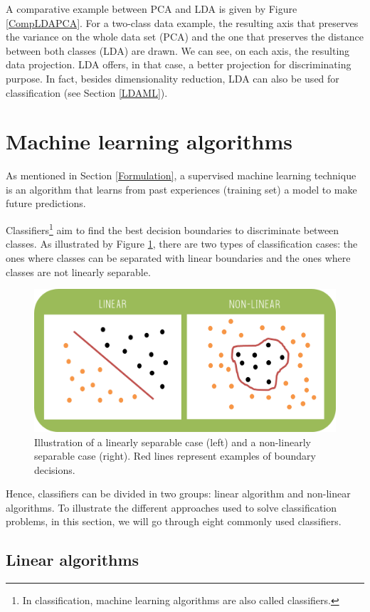 \documentclass[a4paper,10pt]{article}
\begin{document}
A comparative example between PCA and LDA is given by Figure \ref{CompLDAPCA}. For a two-class data example, the resulting axis that preserves the variance on the whole data set (PCA) and the one that preserves the distance between both classes (LDA) are drawn. We can see, on each axis, the resulting data projection. LDA offers, in that case, a better projection for discriminating purpose. In fact, besides dimensionality reduction, LDA can also be used for classification (see Section \ref{LDAML}).

\section{Machine learning algorithms}
\label{MLtech}
As mentioned in Section \ref{Formulation}, a supervised machine learning technique is an algorithm that learns from past experiences (training set) a model to make future predictions.

Classifiers\footnote{In classification, machine learning algorithms are also called classifiers.} aim to find the best decision boundaries to discriminate between classes. As illustrated by Figure \ref{LinearVsNonLinear}, there are two types of classification cases: the ones where classes can be separated with linear boundaries and the ones where classes are not linearly separable.

\begin{figure}[htbp]
\centerline{\includegraphics[width=0.65\linewidth]{./figures/LinearNonLinear.png}}
\caption{Illustration of a linearly separable case (left) and a non-linearly separable case (right). Red lines represent examples of boundary decisions.}
\label{LinearVsNonLinear}
\end{figure}

Hence, classifiers can be divided in two groups: linear algorithm and non-linear algorithms. To illustrate the different approaches used to solve classification problems, in this section, we will go through eight commonly used classifiers.

\subsection{Linear algorithms}
\end{document}
